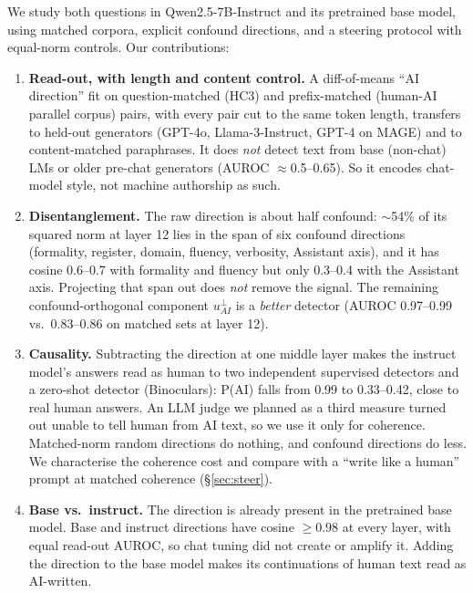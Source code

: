 We study both questions in Qwen2.5-7B-Instruct and its pretrained base model, using matched corpora, explicit confound directions, and a steering protocol with equal-norm controls. Our contributions:
\begin{enumerate}
    \item \textbf{Read-out, with length and content control.} A diff-of-means ``AI direction'' fit on question-matched (HC3) and prefix-matched (human-AI parallel corpus) pairs, with every pair cut to the same token length, transfers to held-out generators (GPT-4o, Llama-3-Instruct, GPT-4 on MAGE) and to content-matched paraphrases. It does \emph{not} detect text from base (non-chat) LMs or older pre-chat generators (AUROC $\approx$0.5--0.65). So it encodes chat-model style, not machine authorship as such.
    \item \textbf{Disentanglement.} The raw direction is about half confound: $\sim$54\% of its squared norm at layer 12 lies in the span of six confound directions (formality, register, domain, fluency, verbosity, Assistant axis), and it has cosine 0.6--0.7 with formality and fluency but only 0.3--0.4 with the Assistant axis. Projecting that span out does \emph{not} remove the signal. The remaining confound-orthogonal component $u_{AI}^{\perp}$ is a \emph{better} detector (AUROC 0.97--0.99 vs.\ 0.83--0.86 on matched sets at layer 12).
    \item \textbf{Causality.} Subtracting the direction at one middle layer makes the instruct model's answers read as human to two independent supervised detectors and a zero-shot detector (Binoculars): P(AI) falls from 0.99 to 0.33--0.42, close to real human answers. An LLM judge we planned as a third measure turned out unable to tell human from AI text, so we use it only for coherence. Matched-norm random directions do nothing, and confound directions do less. We characterise the coherence cost and compare with a ``write like a human'' prompt at matched coherence (\S\ref{sec:steer}).
    \item \textbf{Base vs.\ instruct.} The direction is already present in the pretrained base model. Base and instruct directions have cosine $\geq 0.98$ at every layer, with equal read-out AUROC, so chat tuning did not create or amplify it. Adding the direction to the base model makes its continuations of human text read as AI-written.
\end{enumerate}
